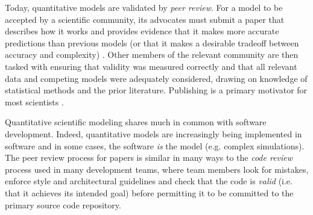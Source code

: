 \documentclass[9pt]{sig-alternate}
\begin{document}
Today, quantitative models are validated by \emph{peer review}. For a model to be accepted by a scientific community, its advocates must submit a paper that describes how it works and provides evidence that it makes more accurate predictions than previous models (or that it makes a desirable tradeoff  between accuracy and complexity) \cite{box1987empirical}. Other members of the relevant community are then tasked with ensuring that validity was measured correctly and that all relevant data and competing models were adequately considered, drawing on knowledge of statistical methods and the prior literature. Publishing is a primary motivator for most scientists \cite{howison2011scientific}.

Quantitative scientific modeling shares much in common with software development. Indeed, quantitative models are increasingly being implemented in software and in some cases, the software \emph{is} the model (e.g. complex simulations). The peer review process for papers is similar in many ways to the \emph{code review} process used in many development teams, where team members look for mistakes, enforce style and architectural guidelines and check that the code is \emph{valid} (i.e. that it achieves its intended goal) before permitting it to be committed to the primary source code repository. 
\end{document}
